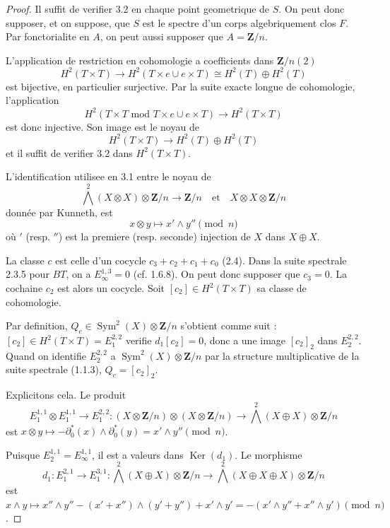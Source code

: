 \documentclass[11pt,a4paper]{article}
\theoremstyle{plain}
\theoremstyle{definition}
\DeclareMathOperator{\Sym}{Sym}
\DeclareMathOperator{\Ker}{Ker}
\begin{document}
\begin{proof}
Il suffit de verifier 3.2 en chaque point geometrique de $S$. On peut donc supposer, et on suppose, que $S$ est le spectre d'un corps algebriquement clos $F$. Par fonctorialite en $A$, on peut aussi supposer que $A = \mathbf{Z}/n$.

L'application de restriction en cohomologie a coefficients dans $\mathbf{Z}/n(2)$
\[
H^2(T \times T) \to H^2(T \times e \cup e \times T) \cong H^2(T) \oplus H^2(T)
\]
est bijective, en particulier surjective. Par la suite exacte longue de cohomologie, l'application
\[
H^2(T \times T \text{ mod } T \times e \cup e \times T) \to H^2(T \times T)
\]
est donc injective. Son image est le noyau de
\begin{equation}\label{3.2.1}
H^2(T \times T) \to H^2(T) \oplus H^2(T)
\end{equation}
et il suffit de verifier 3.2 dans $H^2(T \times T)$.

L'identification utilisee en 3.1 entre le noyau de
\[
\bigwedge^2(X \otimes X) \otimes \mathbf{Z}/n \to \mathbf{Z}/n \quad \text{et} \quad X \otimes X \otimes \mathbf{Z}/n
\]
donn\'ee par Kunneth, est
\[
x \otimes y \mapsto x' \wedge y'' \pmod{n}
\]
o\`u $'$ (resp. $''$) est la premiere (resp. seconde) injection de $X$ dans $X \oplus X$.

La classe $c$ est celle d'un cocycle $c_3 + c_2 + c_1 + c_0$ (2.4). Dans la suite spectrale 2.3.5 pour $BT$, on a $E_\infty^{1,3} = 0$ (cf. 1.6.8). On peut donc supposer que $c_3 = 0$. La cochaine $c_2$ est alors un cocycle. Soit $[c_2] \in H^2(T \times T)$ sa classe de cohomologie.

Par definition, $Q_c \in \Sym^2(X) \otimes \mathbf{Z}/n$ s'obtient comme suit : $[c_2] \in H^2(T \times T) = E_1^{2,2}$ verifie $d_1[c_2] = 0$, donc a une image $[c_2]_2$ dans $E_2^{2,2}$. Quand on identifie $E_2^{2,2}$ a $\Sym^2(X) \otimes \mathbf{Z}/n$ par la structure multiplicative de la suite spectrale (1.1.3), $Q_c = [c_2]_2$.

Explicitons cela. Le produit
\[
E_1^{1,1} \otimes E_1^{1,1} \to E_1^{2,2} : (X \otimes \mathbf{Z}/n) \otimes (X \otimes \mathbf{Z}/n) \to \bigwedge^2(X \oplus X) \otimes \mathbf{Z}/n
\]
est $x \otimes y \mapsto -\partial_0^*(x) \wedge \partial_0^*(y) = x' \wedge y'' \pmod{n}$.

Puisque $E_2^{1,1} = E_\infty^{1,1}$, il est a valeurs dans $\Ker(d_1)$. Le morphisme
\[
d_1 : E_1^{2,1} \to E_1^{3,1} : \bigwedge^2(X \oplus X) \otimes \mathbf{Z}/n \to \bigwedge^2(X \oplus X \oplus X) \otimes \mathbf{Z}/n
\]
est $x \wedge y \mapsto x'' \wedge y'' - (x' + x'') \wedge (y' + y'') + x' \wedge y' = -(x' \wedge y'' + x'' \wedge y') \pmod{n}$.


\end{proof}
\end{document}
